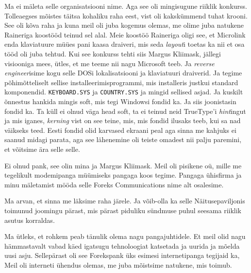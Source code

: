 Ma ei mäleta selle organisatsiooni nime. Aga  see oli mingisugune riiklik konkurss. Tolleaegses mõistes täitsa kohaliku raha eest, vist oli kakskümmend tuhat krooni. See oli kõva raha ja kuna meil oli juba kogemus olemas, me olime juba natukene Raineriga koostööd teinud sel alal. Meie koostöö Raineriga oligi see, et Microlink enda klaviatuure müües pani kaasa draiveri, mis seda \emph{layout}i  toetas ka nii et osa tööd oli juba tehtud. Kui see konkurss tehti siis Margus Kliimask, jällegi visiooniga mees, ütles, et me teeme nii nagu Microsoft teeb. Ja \emph{reverse engineer}isime  kogu selle DOSi lokalisatsiooni ja klaviatuuri draiverid. Ja tegime põhimõtteliselt sellise installeerimisprogrammi, mis installeris justkui standard komponendid.  \verb|KEYBOARD.SYS| ja \verb|COUNTRY.SYS| ja mingid sellised asjad. Ja kuskilt õnnestus hankida mingis soft, mis tegi Windowsi fondid ka. Ja siis joonistasin fondid ka. Ta küll ei olnud väga head soft, ta ei teinud neid TrueType'i \emph{hint}ingut ja mis iganes, \emph{kerning} vist on see teine, mis, mis fondid ilusaks teeb, kui sa nad väikseks teed. Eesti fondid olid karvased ekraani peal aga sinna me kahjuks ei saanud midagi parata, aga  see lähenemine oli teiste omadest nii palju paremini, et võitsime ära selle selle.


Ei olnud pank, see olin mina ja Margus Kliimask. Meil oli pisikene oü, mille me tegelikult modemipanga müümiseks pangaga koos tegime. Pangaga ühisfirma ja minu mäletamist mööda selle Foreks Communications nime alt osalesime. 


Ma arvan, et sinna me läksime raha järele. Ja võib-olla ka selle Näitusepaviljonis toimunud joomingu pärast, mis pärast piduliku sündmuse puhul seesama riiklik asutus korraldas.


Ma ütleks, et  rohkem peab tänulik olema nagu pangajuhtidele. Et meil olid nagu hämmastavalt vabad käed igatsugu tehnoloogiat katsetada ja uurida ja mõelda uusi asju. Sellepärast oli see Forekspank  üks esimesi internetipanga tegijaid ka, Meil oli interneti ühendus olemas, me juba mõistsime natukene, mis toimub. 


